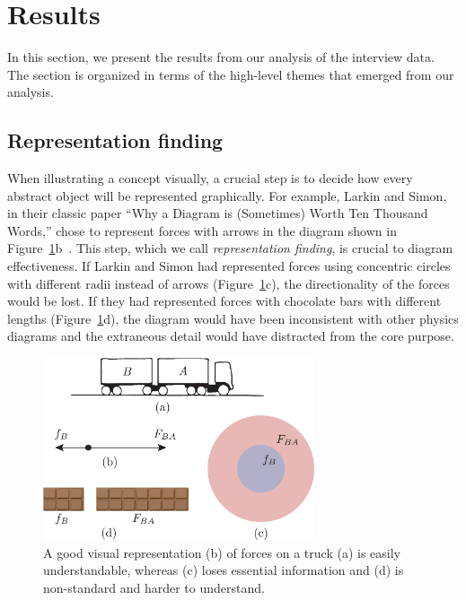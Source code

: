 \section{Results}
\label{sec:interview-results}



In this section, we present the results from our analysis of the interview data. The section is organized in terms of the high-level themes that emerged from our analysis.

\subsection{Representation finding}

When illustrating a concept visually, a crucial step is to decide how every abstract object will be represented graphically. For example, Larkin and Simon, in their classic paper ``Why a Diagram is (Sometimes) Worth Ten Thousand Words,'' chose to represent forces with arrows in the diagram shown in Figure~\ref{fig:forcediagram}b~\cite{whyDiagramWorth}. This step, which we call \textit{representation finding}, is crucial to diagram effectiveness. If Larkin and Simon had represented forces using concentric circles with different radii instead of arrows (Figure~\ref{fig:forcediagram}c), the directionality of the forces would be lost. If they had represented forces with chocolate bars with different lengths (Figure~\ref{fig:forcediagram}d), the diagram would have been inconsistent with other physics diagrams and the extraneous detail would have distracted from the core purpose. 

\begin{figure}
    \centering
    \includegraphics[width=8cm]{assets/interviews/larkin-simon-labeled.pdf}
    \caption{A good visual representation (b) of forces on a truck (a) is easily understandable, whereas (c) loses essential information and (d) is non-standard and harder to understand.}
    \label{fig:forcediagram}
\end{figure}


